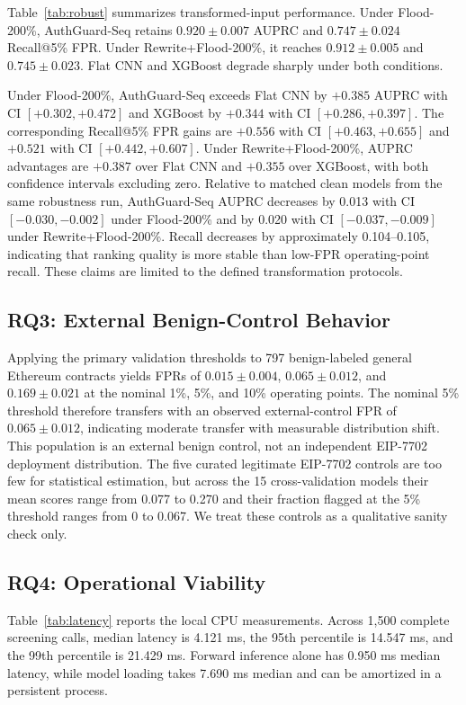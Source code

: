 \documentclass[conference]{IEEEtran}
\begin{document}
Table~\ref{tab:robust} summarizes transformed-input performance. Under Flood-200\%, AuthGuard-Seq retains $0.920\pm0.007$ AUPRC and $0.747\pm0.024$ Recall@5\% FPR. Under Rewrite+Flood-200\%, it reaches $0.912\pm0.005$ and $0.745\pm0.023$. Flat CNN and XGBoost degrade sharply under both conditions.



Under Flood-200\%, AuthGuard-Seq exceeds Flat CNN by $+0.385$ AUPRC with CI $[+0.302,+0.472]$ and XGBoost by $+0.344$ with CI $[+0.286,+0.397]$. The corresponding Recall@5\% FPR gains are $+0.556$ with CI $[+0.463,+0.655]$ and $+0.521$ with CI $[+0.442,+0.607]$. Under Rewrite+Flood-200\%, AUPRC advantages are $+0.387$ over Flat CNN and $+0.355$ over XGBoost, with both confidence intervals excluding zero. Relative to matched clean models from the same robustness run, AuthGuard-Seq AUPRC decreases by 0.013 with CI $[-0.030,-0.002]$ under Flood-200\% and by 0.020 with CI $[-0.037,-0.009]$ under Rewrite+Flood-200\%. Recall decreases by approximately 0.104--0.105, indicating that ranking quality is more stable than low-FPR operating-point recall. These claims are limited to the defined transformation protocols.

\subsection{RQ3: External Benign-Control Behavior}

Applying the primary validation thresholds to 797 benign-labeled general Ethereum contracts yields FPRs of $0.015\pm0.004$, $0.065\pm0.012$, and $0.169\pm0.021$ at the nominal 1\%, 5\%, and 10\% operating points. The nominal 5\% threshold therefore transfers with an observed external-control FPR of $0.065\pm0.012$, indicating moderate transfer with measurable distribution shift. This population is an external benign control, not an independent EIP-7702 deployment distribution. The five curated legitimate EIP-7702 controls are too few for statistical estimation, but across the 15 cross-validation models their mean scores range from 0.077 to 0.270 and their fraction flagged at the 5\% threshold ranges from 0 to 0.067. We treat these controls as a qualitative sanity check only.

\subsection{RQ4: Operational Viability}

Table~\ref{tab:latency} reports the local CPU measurements. Across 1,500 complete screening calls, median latency is 4.121 ms, the 95th percentile is 14.547 ms, and the 99th percentile is 21.429 ms. Forward inference alone has 0.950 ms median latency, while model loading takes 7.690 ms median and can be amortized in a persistent process.
\end{document}
